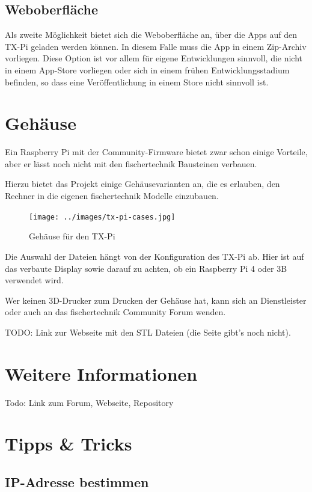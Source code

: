 \documentclass[
  paper=A4,
  ngerman,
  fontsize=12pt,
  parskip=half-,
]{scrbook}
\begin{document}
\section{Weboberfläche}

Als zweite Möglichkeit bietet sich die Weboberfläche an, über die
Apps auf den TX-Pi geladen werden können. In diesem Falle muss die
App in einem Zip-Archiv vorliegen.
Diese Option ist vor allem für eigene Entwicklungen sinnvoll, die
nicht in einem App-Store vorliegen oder sich in einem frühen Entwicklungsstadium
befinden, so dass eine Veröffentlichung in einem Store nicht sinnvoll ist.


\chapter{Gehäuse}

Ein Raspberry Pi mit der Community-Firmware bietet zwar schon einige
Vorteile, aber er lässt noch nicht mit den fischertechnik Bausteinen 
verbauen. 

Hierzu bietet das Projekt einige Gehäusevarianten an, die es erlauben, den 
Rechner in die eigenen fischertechnik Modelle einzubauen.

\begin{figure}[ht]
\centering
\texttt{[image: ../images/tx-pi-cases.jpg]}
\caption{Gehäuse für den TX-Pi}
\end{figure}

Die Auswahl der Dateien hängt von der Konfiguration des TX-Pi ab. 
Hier ist auf das verbaute Display sowie darauf zu achten, ob
ein Raspberry Pi 4 oder 3B verwendet wird.

Wer keinen 3D-Drucker zum Drucken der Gehäuse hat, kann sich an
Dienstleister oder auch an das fischertechnik Community Forum wenden.




TODO: Link zur Webseite mit den STL Dateien (die Seite gibt's noch nicht).




\chapter{Weitere Informationen}
Todo: Link zum Forum, Webseite, Repository


\chapter{Tipps \& Tricks}

\section{IP-Adresse bestimmen}
\label{sec:ipaddr}
\end{document}
